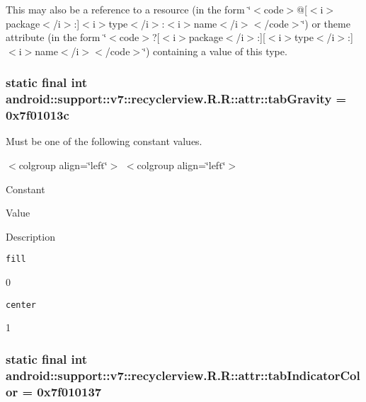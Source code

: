 This may also be a reference to a resource (in the form \char`\"{}$<$code$>$@\mbox{[}$<$i$>$package$<$/i$>$:\mbox{]}$<$i$>$type$<$/i$>$:$<$i$>$name$<$/i$>$$<$/code$>$\char`\"{}) or theme attribute (in the form \char`\"{}$<$code$>$?\mbox{[}$<$i$>$package$<$/i$>$:\mbox{]}\mbox{[}$<$i$>$type$<$/i$>$:\mbox{]}$<$i$>$name$<$/i$>$$<$/code$>$\char`\"{}) containing a value of this type. \hypertarget{classandroid_1_1support_1_1v7_1_1recyclerview_1_1_r_1_1attr_8580be1bd202a5be906454f1f841fedc}{
\subsubsection[{tabGravity}]{\setlength{\rightskip}{0pt plus 5cm}static final int android::support::v7::recyclerview.R.R::attr::tabGravity = 0x7f01013c}}
\label{classandroid_1_1support_1_1v7_1_1recyclerview_1_1_r_1_1attr_8580be1bd202a5be906454f1f841fedc}


Must be one of the following constant values. \begin{TabularC}{0}
\hline
\end{TabularC}
$<$colgroup align=\char`\"{}left\char`\"{}$>$ $<$colgroup align=\char`\"{}left\char`\"{}$>$ 

Constant

Value

Description 

{\tt fill}

0

{\tt center}

1\hypertarget{classandroid_1_1support_1_1v7_1_1recyclerview_1_1_r_1_1attr_9985578a7ecb5afb58873949f02862f0}{
\subsubsection[{tabIndicatorColor}]{\setlength{\rightskip}{0pt plus 5cm}static final int android::support::v7::recyclerview.R.R::attr::tabIndicatorColor = 0x7f010137}}
\label{classandroid_1_1support_1_1v7_1_1recyclerview_1_1_r_1_1attr_9985578a7ecb5afb58873949f02862f0}


